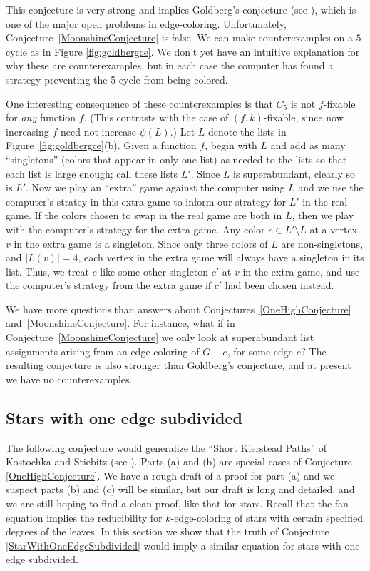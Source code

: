 \documentclass[12pt]{article}
\theoremstyle{plain}
\newtheorem{problem}{Problem}
\theoremstyle{definition}
\theoremstyle{remark}
\begin{document}
This conjecture is very strong and implies Goldberg's conjecture 
(see \cite[p.~155ff]{stiebitz2012graph}), which is one of the major open
problems in edge-coloring.
Unfortunately, Conjecture~\ref{MoonshineConjecture} is false.  We can make
counterexamples on a $5$-cycle as in Figure \ref{fig:goldbergce}.  We don't yet
have an intuitive explanation for why these are counterexamples, but in each
case the computer has found a strategy preventing the 5-cycle from being colored.

One interesting consequence of these counterexamples 
is that $C_5$ is not $f$-fixable for \emph{any}
function $f$.  (This contrasts with the case of $(f,k)$-fixable, since now
increasing $f$ need not increase $\psi(L)$.)
Let $L$ denote the lists in Figure~\ref{fig:goldbergce}(b).
Given a function $f$, begin with $L$ and add as many ``singletons'' (colors that appear in
only one list) as needed to the lists so that each list is large enough; call
these lists $L'$.  Since $L$ is superabundant, clearly so is $L'$.
Now we play an ``extra'' game against the computer using $L$ and we use the
computer's stratey in this extra game to inform our strategy for $L'$ in the
real game.  If the colors chosen to swap in the real game are both in $L$, then
we play with the computer's strategy for the extra game.  Any color $c\in
L'\setminus L$ at a vertex $v$ in the extra game is a singleton.  Since only
three colors of $L$ are non-singletons, and $|L(v)|=4$, each vertex in the
extra game will always have a singleton in its list.  Thus, we treat $c$ like
some other singleton $c'$ at $v$ in the extra game, and use the computer's strategy
from the extra game if $c'$ had been chosen instead.

We have more questions than answers about Conjectures~\ref{OneHighConjecture}
and~\ref{MoonshineConjecture}.  For instance,
what if in Conjecture~\ref{MoonshineConjecture} we only look at
superabundant list assignments arising from an edge coloring of $G-e$, for some
edge $e$?  The resulting conjecture is also stronger than Goldberg's
conjecture, and at present we have no counterexamples.
	
\subsection{Stars with one edge subdivided}
The following conjecture would generalize the ``Short Kierstead Paths'' of Kostochka
and Stiebitz (see \cite[p.~46ff]{stiebitz2012graph}).  Parts (a) and (b) are
special cases of Conjecture \ref{OneHighConjecture}.  We have a rough draft of
a proof for part (a) and we suspect parts (b) and (c) will be similar, 
but our draft is long and detailed, and we are still hoping to find a clean
proof, like that for stars.
Recall that the fan equation implies the reducibility for $k$-edge-coloring of
stars with certain specified degrees of the leaves.  In this section we show
that the truth of Conjecture \ref{StarWithOneEdgeSubdivided} would imply a
similar equation for stars with one edge subdivided.
\end{document}
